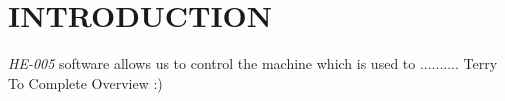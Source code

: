 
\chapter{INTRODUCTION}
\thispagestyle{fancy}

\textit {HE-005} software allows us to control the machine which is used to .......... Terry To Complete Overview :)
